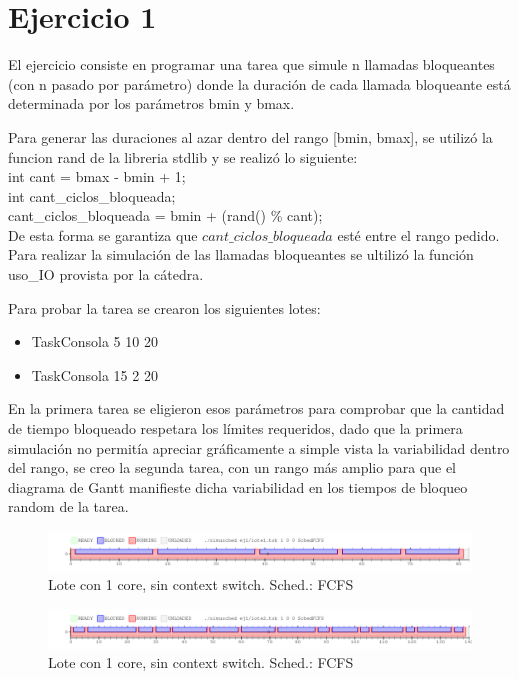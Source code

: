 \section{Ejercicio 1}
El ejercicio consiste en programar una tarea que simule n llamadas bloqueantes (con n pasado por parámetro) donde la duración de cada llamada bloqueante está determinada por los parámetros bmin y bmax.

Para generar las duraciones al azar dentro del rango [bmin, bmax], se utilizó la funcion rand de la libreria stdlib y se realizó lo siguiente:\\

int cant = bmax - bmin + 1; \\
int cant_ciclos_bloqueada;\\
cant_ciclos_bloqueada = bmin + (rand() \% cant);\\

De esta forma se garantiza que $cant\_ciclos\_bloqueada$ esté entre el rango pedido.
Para realizar la simulación de las llamadas bloqueantes se ultilizó la función uso_IO provista por la cátedra.

Para probar la tarea se crearon los siguientes lotes:

\begin{itemize}
\item TaskConsola 5 10 20 
\item TaskConsola 15 2 20 
\end{itemize}

En la primera tarea se eligieron esos parámetros para comprobar que la cantidad de tiempo bloqueado respetara los límites requeridos, dado que la primera simulación no permitía apreciar gráficamente a simple vista la variabilidad dentro del rango, se creo la segunda tarea, con un rango más amplio para que el diagrama de Gantt manifieste dicha variabilidad en los tiempos de bloqueo random de la tarea.

\begin{figure}[h]
  \includegraphics[width=\textwidth]{../ej1/lote1.png}
  \caption{Lote con 1 core, sin context switch. Sched.: FCFS}
\end{figure}

\begin{figure}[h]
  \includegraphics[width=\textwidth]{../ej1/lote2.png}
  \caption{Lote con 1 core, sin context switch. Sched.: FCFS}
\end{figure}